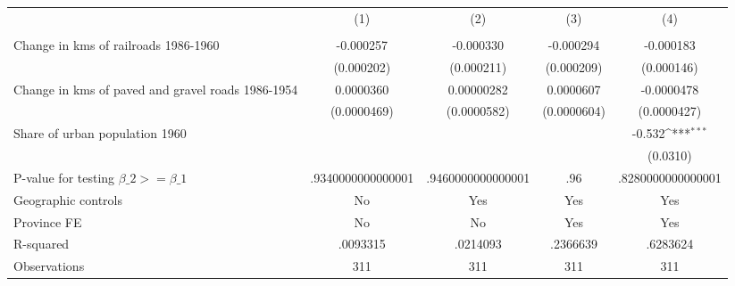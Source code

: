 {
\def\sym#1{\ifmmode^{#1}\else\(^{#1}\)\fi}
\begin{tabular}{l*{4}{c}}
\hline\hline
                &\multicolumn{1}{c}{(1)}&\multicolumn{1}{c}{(2)}&\multicolumn{1}{c}{(3)}&\multicolumn{1}{c}{(4)}\\
                &\multicolumn{1}{c}{}&\multicolumn{1}{c}{}&\multicolumn{1}{c}{}&\multicolumn{1}{c}{}\\
\hline
Change in kms of railroads 1986-1960&-0.000257         &-0.000330         &-0.000294         &-0.000183         \\
                &(0.000202)         &(0.000211)         &(0.000209)         &(0.000146)         \\
[1em]
Change in kms of paved and gravel roads 1986-1954&0.0000360         &0.00000282         &0.0000607         &-0.0000478         \\
                &(0.0000469)         &(0.0000582)         &(0.0000604)         &(0.0000427)         \\
[1em]
Share of urban population 1960&                  &                  &                  &   -0.532\sym{***}\\
                &                  &                  &                  & (0.0310)         \\
\hline
P-value for testing $\beta\_{2} >= \beta\_{1}$&.9340000000000001         &.9460000000000001         &      .96         &.8280000000000001         \\
Geographic controls&       No         &      Yes         &      Yes         &      Yes         \\
Province FE     &       No         &       No         &      Yes         &      Yes         \\
R-squared       & .0093315         & .0214093         & .2366639         & .6283624         \\
Observations    &      311         &      311         &      311         &      311         \\
\hline\hline
\end{tabular}
}
